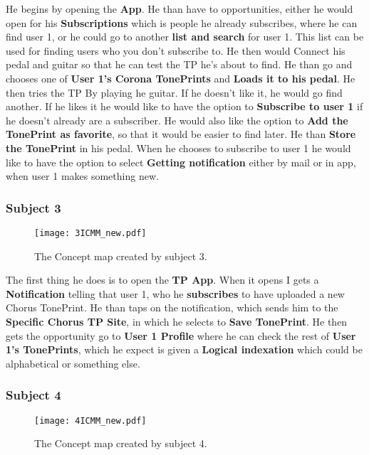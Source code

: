 He begins by opening the \textbf{App}. He than have to opportunities, either he would open for his \textbf{Subscriptions} which is people he already subscribes, where he can find user 1, or he could go to another \textbf{list and search} for user 1. This list can be used for finding users who you don’t subscribe to. He then would Connect his pedal and guitar so that he can test the TP he’s about to find. He than go and chooses one of \textbf{User 1's Corona TonePrints} and \textbf{Loads it to his pedal}. He then tries the TP By playing he guitar. If he doesn’t like it, he would go find another. If he likes it he would like to have the option to \textbf{Subscribe to user 1} if he doesn’t already are a subscriber. He would also like the option to \textbf{Add the TonePrint as favorite}, so that it would be easier to find later. He than \textbf{Store the TonePrint} in his pedal. When he chooses to subscribe to user 1 he would like to have the option to select \textbf{Getting notification} either by mail or in app, when user 1 makes something new.

\subsubsection{Subject 3}
\label{Subject3ICMM}
\begin{figure}[H]
	\centering
	\texttt{[image: 3ICMM\_new.pdf]}
	\caption{The Concept map created by subject 3.}
	\label{fig:ICMM3}
\end{figure}

The first thing he does is to open the \textbf{TP App}. When it opens I gets a \textbf{Notification} telling that user 1, who he \textbf{subscribes} to have uploaded a new Chorus TonePrint. He than taps on the notification, which sends him to the \textbf{Specific Chorus TP Site}, in which he selects to \textbf{Save TonePrint}. He then gets the opportunity go to \textbf{User 1 Profile} where he can check the rest of \textbf{User 1’s TonePrints}, which he expect is given a \textbf{Logical indexation} which could be alphabetical or something else.

\subsubsection{Subject 4}
\label{Subject4ICMM}
\begin{figure}[H]
	\centering
	\texttt{[image: 4ICMM\_new.pdf]}
	\caption{The Concept map created by subject 4.}
	\label{fig:ICMM4}
\end{figure}

